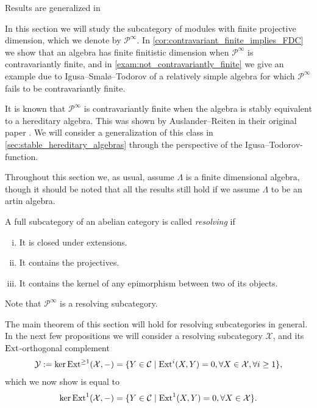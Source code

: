 
Results are generalized in \cite{Trl01}

In this section we will study the subcategory of modules with finite projective dimension, which we denote by $\mathcal P^\infty$. In \cref{cor:contravariant_finite_implies_FDC} we show that an algebra has finite finitistic dimension when $\mathcal P^\infty$ is contravariantly finite, and in \cref{exam:not_contravariantly_finite} we give an example due to Igusa--Smalø--Todorov of a relatively simple algebra for which $\mathcal P^\infty$ fails to be contravariantly finite.

It is known that $\mathcal P^\infty$ is contravariantly finite when the algebra is stably equivalent to a hereditary algebra. This was shown by Auslander--Reiten in their original paper \cite{AR91}. We will consider a generalization of this class in \cref{sec:stable_hereditary_algebras} through the perspective of the Igusa--Todorov-function.

Throughout this section we, as usual, assume $\Lambda$ is a finite dimensional algebra, though it should be noted that all the results still hold if we assume $\Lambda$ to be an artin algebra.

\begin{defn}[Resolving]
	A full subcategory of an abelian category is called \emph{resolving} if 
	\begin{enumerate}[i)]
		\item It is closed under extensions.
		\item It contains the projectives.
		\item It contains the kernel of any epimorphism between two of its objects.
	\end{enumerate}
\end{defn}

Note that $\mathcal P^\infty$ is a resolving subcategory.

The main theorem of this section will hold for resolving subcategories in general. In the next few propositions we will consider a resolving subcategory $\mathcal X$, and its $\operatorname{Ext}$-orthogonal complement
\begin{align*}
	\mathcal Y := \ker \operatorname{Ext}^{\geq 1}(\mathcal X, -) = \{Y \in \mathcal C \mid \operatorname{Ext}^i(X, Y)=0, \forall X \in \mathcal X, \forall i \geq 1\},
\end{align*}
which we now show is equal to 
\begin{align*}
\ker \operatorname{Ext}^1(\mathcal X, -) = \{Y \in \mathcal C \mid \operatorname{Ext}^1(X, Y)=0, \forall X \in \mathcal X\}.
\end{align*}

